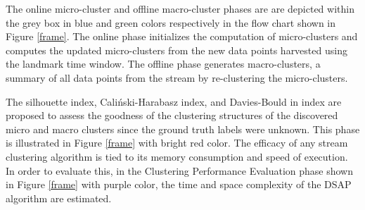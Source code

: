 The online micro-cluster and offline macro-cluster phases are are depicted within the grey box in blue and green colors respectively in the flow chart shown in Figure \ref{frame}. The online phase initializes the computation of micro-clusters and computes the updated micro-clusters from the new data points harvested using the landmark time window. The offline phase generates macro-clusters, a summary of all data points from the stream by re-clustering the micro-clusters. 

The silhouette index, Caliński-Harabasz index, and Davies-Bould in index are proposed to assess the goodness of  the clustering structures of the discovered micro and macro clusters since the ground truth labels were unknown. This phase is illustrated in Figure \ref{frame} with bright red color. The efficacy of any stream clustering algorithm is tied to its memory consumption and speed of execution. In order to evaluate this, in the Clustering Performance Evaluation phase shown in Figure \ref{frame} with purple color, the time and space complexity of the DSAP algorithm are estimated. 


























